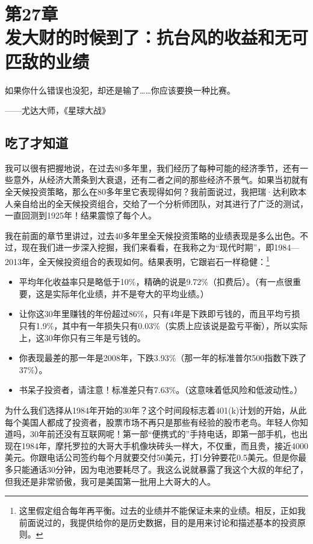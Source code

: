 
\section[第27章\q 发大财的时候到了：抗台风的收益和无可匹敌的业绩]{第27章\\ 发大财的时候到了：抗台风的收益和无可匹敌的业绩}

\begin{BookQuote}
如果你什么错误也没犯，却还是输了……你应该要换一种比赛。

\hfill ——尤达大师，《星球大战》
\end{BookQuote}

\subsection{吃了才知道}

我可以很有把握地说，在过去80多年里，我们经历了每种可能的经济季节，还有一些意外，从经济大萧条到大衰退，还有二者之间的那些经济不景气。如果当初就有全天候投资策略，那么在80多年里它表现得如何？我前面说过，我把瑞·达利欧本人亲自给出的全天候投资组合，交给了一个分析师团队，对其进行了广泛的测试，一直回测到1925年！结果震惊了每个人。

我在前面的章节里讲过，过去40多年里全天候投资策略的业绩表现是多么出色。不过，现在我们进一步深入挖掘，我们来看看，在我称之为“现代时期”，即1984—2013年，全天候投资组合的表现如何。结果表明，它跟岩石一样稳健：\footnote{\label{fn:pdf-27-1}这里假定组合每年再平衡。过去的业绩并不能保证未来的业绩。相反，正如我前面说过的，我提供给你的是历史数据，目的是用来讨论和描述基本的投资原则。}

\begin{itemize}
\item 平均年化收益率只是略低于10\%，精确的说是9.72\%（扣费后）。（有一点很重要，这是实际年化业绩，并不是夸大的平均业绩。）
\item 让你这30年里赚钱的年份超过86\%，只有4年是下跌即亏钱的，而且平均亏损只有1.9\%，其中有一年损失只有0.03\%（实质上应该说是盈亏平衡），所以实际上，这30年你只有三年是亏钱的。
\item 你表现最差的那一年是2008年，下跌3.93\%（那一年的标准普尔500指数下跌了37\%）。
\item 书呆子投资者，请注意！标准差只有7.63\%。（这意味着低风险和低波动性。）
\end{itemize}

为什么我们选择从1984年开始的30年？这个时间段标志着401(k)计划的开始，从此每个美国人都成了投资者，股票市场不再只是那些有经验的股市老鸟。年轻人你知道吗，30年前还没有互联网呢！第一部“便携式的”手持电话，即第一部手机，也出现在1984年，摩托罗拉的大哥大手机像块砖头一样大，不仅重，而且贵，接近4000美元。你跟电话公司签约每个月就要交付50美元，打1分钟要花0.5美元。但是你最多只能通话30分钟，因为电池要耗尽了。我这么说就暴露了我这个大叔的年纪了，但我还是非常骄傲，我可是美国第一批用上大哥大的人。


